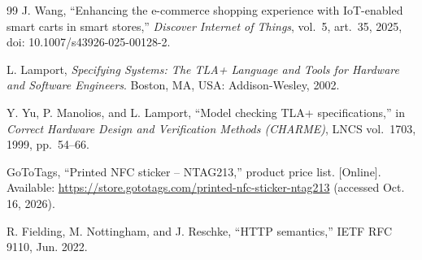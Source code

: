 \documentclass[conference]{IEEEtran}
\begin{document}
\begin{thebibliography}{99}
J. Wang, ``Enhancing the e-commerce shopping experience with
IoT-enabled smart carts in smart stores,'' \emph{Discover Internet of
Things}, vol.~5, art.~35, 2025, doi: 10.1007/s43926-025-00128-2.

L. Lamport, \emph{Specifying Systems: The TLA+ Language and Tools for
Hardware and Software Engineers}. Boston, MA, USA: Addison-Wesley,
2002.

Y. Yu, P. Manolios, and L. Lamport, ``Model checking TLA+
specifications,'' in \emph{Correct Hardware Design and Verification
Methods (CHARME)}, LNCS vol.~1703, 1999, pp.~54--66.

GoToTags, ``Printed NFC sticker -- NTAG213,'' product price list.
[Online]. Available: \url{https://store.gototags.com/printed-nfc-sticker-ntag213}
(accessed Oct. 16, 2026).

R. Fielding, M. Nottingham, and J. Reschke, ``HTTP semantics,'' IETF
RFC 9110, Jun. 2022.

\end{thebibliography}
\end{document}
